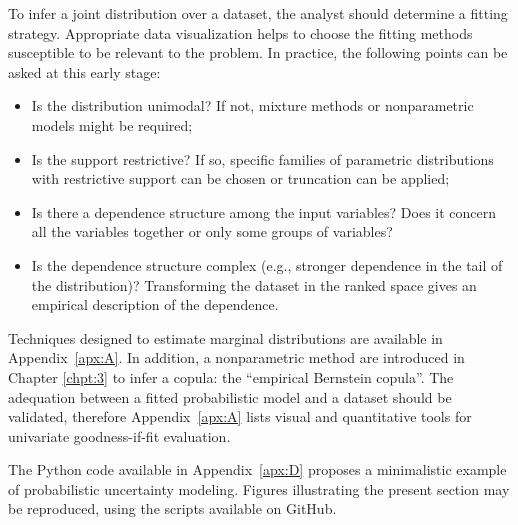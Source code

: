 To infer a joint distribution over a dataset, the analyst should determine a fitting strategy. 
Appropriate data visualization helps to choose the fitting methods susceptible to be relevant to the problem. 
In practice, the following points can be asked at this early stage:
\begin{itemize}
    \item Is the distribution unimodal? If not, mixture methods or nonparametric models might be required;
    \item Is the support restrictive? If so, specific families of parametric distributions with restrictive support can be chosen or truncation can be applied;
    \item Is there a dependence structure among the input variables? Does it concern all the variables together or only some groups of variables? 
    \item Is the dependence structure complex (e.g., stronger dependence in the tail of the distribution)? Transforming the dataset in the ranked space gives an empirical description of the dependence. 
\end{itemize} 

Techniques designed to estimate marginal distributions are available in Appendix~\ref{apx:A}. 
In addition, a nonparametric method are introduced in Chapter \ref{chpt:3} to infer a copula: the ``empirical Bernstein copula''. 
The adequation between a fitted probabilistic model and a dataset should be validated, therefore Appendix~\ref{apx:A} lists visual and quantitative tools for univariate goodness-if-fit evaluation.


\begin{otexample}
    The Python code available in Appendix~\ref{apx:D} proposes a minimalistic \ots example of probabilistic uncertainty modeling. 
    Figures illustrating the present section may be reproduced, using the \ots scripts available on GitHub\footnotemark. 
\end{otexample}

